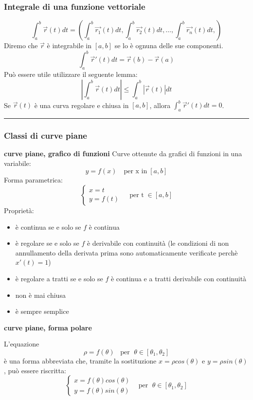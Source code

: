 \subsubsection*{Integrale di una funzione vettoriale}
\[
    \int_{a}^{b} \vec{r}(t) dt =\left( \int_{a}^{b}\vec{r_1}(t) dt,\int_{a}^{b}\vec{r_2}(t) dt, \dots, \int_{a}^{b}\vec{r_n}(t) dt,\right)
\]
Diremo che $\vec{r}$ è integrabile in $[a,b]$ se lo è ognuna delle sue componenti.\newline
\[
    \int_{a}^{b} \vec{r}'(t) dt = \vec{r}(b) - \vec{r}(a)
\]
Può essere utile utilizzare il seguente lemma:
\[
    \left| \int_{a}^{b}\vec{r}(t)dt \right| \leq \int_{a}^{b}|\vec{r}(t)|dt
\]
Se $\vec{r}(t)$ è una curva regolare e chiusa in $[a,b]$, allora $\int_{a}^{b}\vec{r}'(t) dt =0$.\newline
\rule{\textwidth}{0,4pt}
\subsubsection*{Classi di curve piane}
\textbf{curve piane, grafico di funzioni}\newline
Curve ottenute da grafici di funzioni in una variabile:
\[
    y = f(x) \quad\text{per x in} \;[a,b]
\]
Forma parametrica:
\[
    \begin{cases}
        x=t \\
        y=f(t)
    \end{cases} \;\;\;\; \text{per t} \;\in[a,b]
\]
Proprietà:
\begin{itemize}
    \item è continua se e solo se $f$ è continua
    \item è regolare se e solo se $f$ è derivabile con continuità (le condizioni di non annullamento della derivata prima sono automaticamente verificate perchè $x'(t) = 1$)
    \item è regolare a tratti se e solo se $f$ è continua e a tratti derivabile con continuità
    \item non è mai chiusa
    \item è sempre semplice
\end{itemize}
\textbf{curve piane, forma polare}\newline
\begin{tcolorbox}
L'equazione
\[
    \rho = f(\theta) \;\;\;\text{per } \; \theta \in [\theta_1, \theta_2]
\]
è una forma abbreviata che, tramite la sostituzione $x= \rho cos(\theta)$ e $y= \rho sin(\theta)$, può essere riscritta:
\[
    \begin{cases}
        x = f(\theta) cos(\theta)\\
        y = f(\theta) sin(\theta)
    \end{cases} \;\;\; \text{per } \; \theta \in [\theta_1, \theta_2]
\]
\end{tcolorbox}
